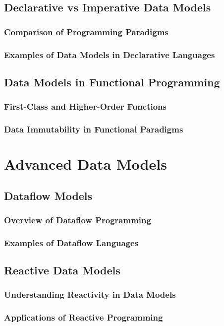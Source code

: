 \documentclass[12pt, oneside]{book}
\begin{document}
\subsection{Declarative vs Imperative Data Models}
\subsubsection{Comparison of Programming Paradigms}
\subsubsection{Examples of Data Models in Declarative Languages}
\subsection{Data Models in Functional Programming}
\subsubsection{First-Class and Higher-Order Functions}
\subsubsection{Data Immutability in Functional Paradigms}
\section{Advanced Data Models}
\subsection{Dataflow Models}
\subsubsection{Overview of Dataflow Programming}
\subsubsection{Examples of Dataflow Languages}
\subsection{Reactive Data Models}
\subsubsection{Understanding Reactivity in Data Models}
\subsubsection{Applications of Reactive Programming}
\end{document}
